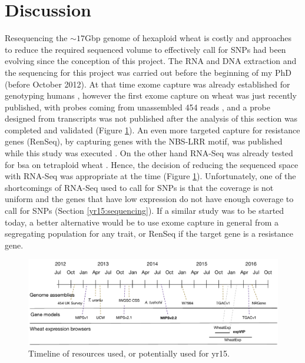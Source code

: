 \section{Discussion} 


Resequencing the $\sim17$Gbp genome of hexaploid wheat is costly and approaches to reduce the required sequenced volume to effectively call for SNPs had been evolving since the conception of this project. 
The RNA and DNA extraction and the sequencing for this project was carried out before the beginning of my PhD (before October 2012). 
At that time exome capture was already established for genotyping humans \citep{Ng2009}, however the first exome capture on wheat was just recently published, with probes coming from unassembled 454 reads \citep{Winfield2012}, and a probe designed from transcripts \citep{Henry2014} was not published after the analysis of this section was completed and validated (Figure \ref{fig:yr15:timeline}).
An even more targeted capture for resistance genes (RenSeq), by capturing genes with the NBS-LRR motif, was published while this study was executed \citep{Jupe2013}.
On the other hand RNA-Seq was already tested for \acrlong{bsa} on tetraploid wheat \citep{Trick2012}.  
Hence, the decision of reducing the sequenced space with RNA-Seq was appropriate at the time (Figure \ref{fig:yr15:timeline}). 
Unfortunately, one of the shortcomings of RNA-Seq used to call for SNPs is that the coverage is not uniform and the genes that have low expression do not have enough coverage to call for SNPs (Section  \ref{yr15:sequencing}).
If a similar study was to be started today, a better alternative would be to use exome capture in general from a segregating population for any trait, or RenSeq if the target gene is a resistance gene. 

\begin{figure}
\includegraphics[width=1\textwidth]{expVIP/Figures/Timeline.pdf}
\caption{Timeline of resources used, or potentially used for \gls{yr15}.}
\label{fig:yr15:timeline}
\end{figure}

